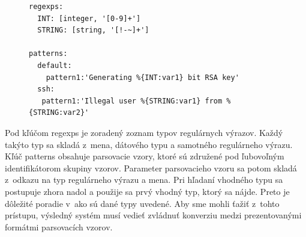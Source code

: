 \begin{figure}[h]
\centering
\begin{minipage}{\textwidth}
\lstset{columns=flexible,breaklines=true,breakatwhitespace=true, showstringspaces=false}
\begin{lstlisting}
regexps:
  INT: [integer, '[0-9]+']
  STRING: [string, '[!-~]+']
  
patterns:
  default:
    pattern1:'Generating %{INT:var1} bit RSA key'
  ssh:
   pattern1:'Illegal user %{STRING:var1} from %{STRING:var2}'
\end{lstlisting} 		
\end{minipage} 
\end{figure}

Pod kľúčom regexps je zoradený zoznam typov regulárnych výrazov. Každý takýto typ sa skladá z~mena, dátového typu a samotného regulárneho výrazu. Kľúč patterns obsahuje parsovacie vzory, ktoré sú združené pod ľubovoľným identifikátorom skupiny vzorov. Parameter parsovacieho vzoru sa potom skladá z~odkazu na typ regulárneho výrazu a mena. Pri hľadaní vhodného typu sa postupuje zhora nadol a použije sa prvý vhodný typ, ktorý sa nájde. Preto je dôležité poradie v~ako sú dané typy uvedené.  Aby sme mohli ťažiť z~tohto prístupu, výsledný systém musí vedieť zvládnuť konverziu medzi prezentovanými formátmi parsovacích vzorov.